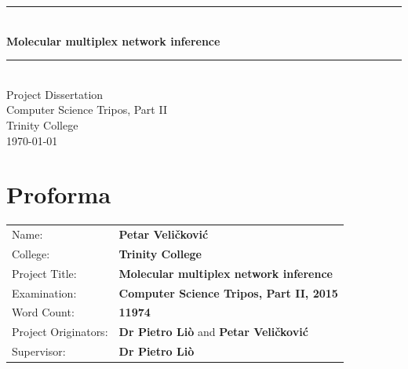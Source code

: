 \documentclass[12pt,a4paper,twoside,openright]{report}
\begin{document}


\newcommand{\HRule}{\rule{\linewidth}{0.5mm}} %


\pagestyle{empty}


\vspace*{60mm}
\begin{center}
\Huge\HRule\\[0.4cm] %
	{\bf Molecular multiplex network inference}
	\HRule \\[20pt] %
Project Dissertation \\
Computer Science Tripos, Part II \\[5mm]
Trinity College \\[5mm]
\today  %
\end{center}


\chapter*{Proforma}

\pagestyle{plain}
\setcounter{page}{1}

{\large
\begin{tabular}{ll}
Name:               & \bf Petar Veli\v{c}kovi\'{c}                       \\
College:            & \bf Trinity College                     \\
Project Title:      & \bf Molecular multiplex network inference \\
Examination:        & \bf Computer Science Tripos, Part II, 2015  \\
Word Count:         & \bf 11974\footnotemark  \\
Project Originators: & {\bf Dr Pietro Li\`{o}} and {\bf Petar Veli\v{c}kovi\'{c}}                    \\
Supervisor:         & \bf Dr Pietro Li\`{o}                    \\ 
\end{tabular}
}
\end{document}
